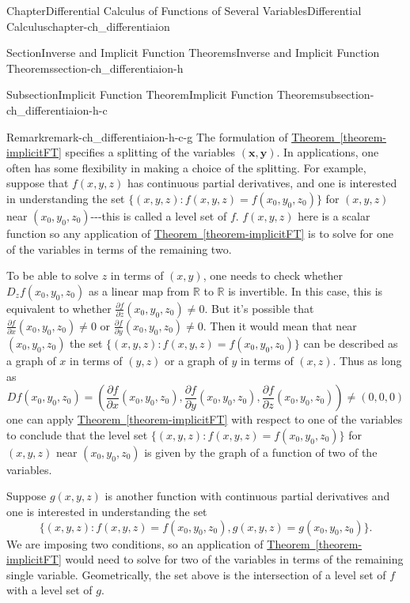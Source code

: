 \documentclass[oneside,10pt,]{book}
\newcommand{\xreffont}{\relax}
\numberwithin{equation}{section}
\newcommand{\bx}{\mathbf{x}}
\newcommand{\by}{\mathbf{y}}
\newcommand{\bbR}{\mathbb{R}}
\begin{document}
\begin{chapterptx}{Chapter}{Differential Calculus of Functions of Several Variables}{}{Differential Calculus}{}{}{chapter-ch_differentiaion}
\begin{sectionptx}{Section}{Inverse and Implicit Function Theorems}{}{Inverse and Implicit Function Theorems}{}{}{section-ch_differentiaion-h}
\begin{subsectionptx}{Subsection}{Implicit Function Theorem}{}{Implicit Function Theorem}{}{}{subsection-ch_differentiaion-h-c}
\begin{remark}{Remark}{}{remark-ch_differentiaion-h-c-g}
The formulation of \hyperref[theorem-implicitFT]{Theorem~{\xreffont\ref{theorem-implicitFT}}} specifies a splitting of the variables \((\bx, \by)\). In applications, one often has some flexibility in making a choice of the splitting. For example, suppose that \(f(x, y, z)\) has continuous partial derivatives, and one is interested in understanding the set \(\{(x, y, z): f(x, y, z)=f(x_{0}, y_{0},z_{0})\}\) for \((x, y, z)\) near \((x_{0}, y_{0},z_{0})\)-{}-{}-this is called a level set of \(f\). \(f(x, y, z)\) here is a scalar function so any application of \hyperref[theorem-implicitFT]{Theorem~{\xreffont\ref{theorem-implicitFT}}} is to solve for one of the variables in terms of the remaining two.%
\par
To be able to solve \(z\) in terms of \((x, y)\), one needs to check whether \(D_{z}f(x_{0}, y_{0},z_{0})\) as a linear map from \(\bbR\) to \(\bbR\) is invertible. In this case, this is equivalent to whether \(\frac{\partial f}{\partial z }(x_{0}, y_{0},z_{0})\ne 0\). But it's possible that \(\frac{\partial f}{\partial x}(x_{0}, y_{0},z_{0})\ne 0\) or \(\frac{\partial f}{\partial  y}(x_{0}, y_{0},z_{0})\ne 0\). Then it would mean that near \((x_{0}, y_{0},z_{0})\) the set \(\{(x, y, z): f(x, y, z)=f(x_{0}, y_{0},z_{0})\}\) can be described as a graph of \(x\) in terms of \((y, z)\) or a graph of \(y\) in terms of \((x, z)\). Thus as long as%
\begin{equation*}
Df(x_{0}, y_{0},z_{0})=(\frac{\partial f}{\partial x}(x_{0}, y_{0},z_{0}), \frac{\partial f}{\partial y}(x_{0}, y_{0},z_{0}),\frac{\partial f}{\partial z}(x_{0}, y_{0},z_{0}))
\ne (0, 0, 0)
\end{equation*}
one can apply \hyperref[theorem-implicitFT]{Theorem~{\xreffont\ref{theorem-implicitFT}}} with respect to one of the variables to conclude that the level set \(\{(x, y, z): f(x, y, z)=f(x_{0}, y_{0},z_{0})\}\) for \((x, y, z)\) near \((x_{0}, y_{0},z_{0})\) is given by the graph of a function of two of the variables.%
\par
Suppose \(g(x, y, z)\) is another function with continuous partial derivatives and one is interested in understanding the set%
\begin{equation}
\{(x, y, z): f(x, y, z)=f(x_{0}, y_{0},z_{0}), g(x, y, z)=g(x_{0}, y_{0},z_{0})\}\text{.}\label{men-eq-leveline}
\end{equation}
We are imposing two conditions, so an application of \hyperref[theorem-implicitFT]{Theorem~{\xreffont\ref{theorem-implicitFT}}} would need to solve for two of the variables in terms of the remaining single variable. Geometrically, the set above is the intersection of a level set of \(f\) with a level set of \(g\).%

\end{remark}
\end{subsectionptx}
\end{sectionptx}
\end{chapterptx}
\end{document}
